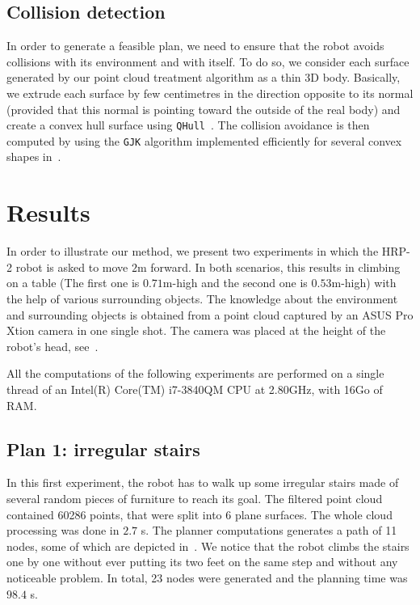 \subsection{Collision detection}

In order to generate a feasible plan, we need to ensure that the robot avoids collisions with its environment and with itself. To do so, we consider each surface generated by our point cloud treatment algorithm as a thin 3D body. Basically, we extrude each surface by few centimetres in the direction opposite to its normal (provided that this normal is pointing toward the outside of the real body) and create a convex hull surface using {\tt QHull}~\cite{qhull:ACM:1996}. The collision avoidance is then computed by using the {\tt GJK} algorithm implemented efficiently for several convex shapes in~\cite{benallegue:icra:2009}.


\section{Results} 

In order to illustrate our method, we present two experiments in which the HRP-2 robot is asked to move $2$m forward. In both scenarios, this results in climbing on a table (The first one is $0.71$m-high and the second one is $0.53$m-high) with the help of various surrounding objects. The knowledge about the environment and surrounding objects is obtained from a point cloud captured by an ASUS Pro Xtion camera in one single shot. The camera was placed at the height of the robot's head, see~.

All the computations of the following experiments are performed on a single thread of an Intel(R) Core(TM) i7-3840QM CPU at 2.80GHz, with 16Go of RAM.

\subsection{Plan 1: irregular stairs}
\label{sec:plan1}


In this first experiment, the robot has to walk up some irregular stairs made of several random pieces of furniture to reach its goal. The filtered point cloud contained 60286 points, that were split into 6 plane surfaces. The whole cloud processing was done in $2.7$ s. The planner computations generates a path of 11 nodes, some of which are depicted in~. We notice that the robot climbs the stairs one by one without ever putting its two feet on the same step and without any noticeable problem.
In total, 23 nodes were generated and the planning time was $98.4$ s.

